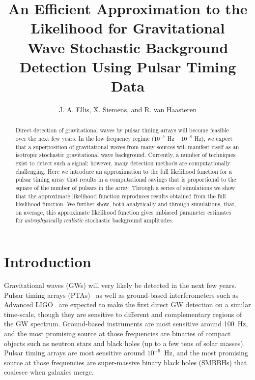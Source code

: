 \documentclass[iop]{emulateapj}
\begin{document}

\title{An Efficient Approximation to the Likelihood for Gravitational\\ Wave Stochastic Background Detection Using Pulsar Timing Data}

\author{J. A. Ellis, X. Siemens, and R. van Haasteren}



\begin{abstract}
Direct detection of gravitational waves by pulsar timing arrays will become feasible over the next few years. In the low frequency regime ($10^{-7}$ Hz -- $10^{-9}$ Hz), we expect that a superposition of gravitational waves from many sources will manifest itself as an isotropic stochastic gravitational wave background. Currently, a number of techniques exist to detect such a signal; however, many detection methods are computationally challenging. Here we introduce an approximation to the full likelihood function for a pulsar timing array that results in a computational savings that is proportional to the square of the number of pulsars in the array. Through a series of simulations we show that the approximate likelihood function reproduces results obtained from the full likelihood function. We further show, both analytically and through simulations, that, on average, this approximate likelihood function gives unbiased parameter estimates for \emph{astrophysically} \emph{realistic} stochastic background amplitudes.
\end{abstract}

\maketitle

\section{Introduction}

Gravitational waves (GWs) will very likely be detected in the next few years. Pulsar timing arrays (PTAs)~\citep{haa+10} as well as ground-based interferometers such as Advanced LIGO~\citep{Waldman:2011vg}  are expected to make the first direct GW detection on a similar time-scale, though they are sensitive to different and complementary regions of the GW spectrum. Ground-based instruments are most sensitive around 100~Hz, and the most promising source at those frequencies are binaries of compact objects such as neutron stars and black holes (up to a few tens of solar masses). Pulsar timing arrays are most sensitive around $10^{-9}$~Hz, and the most promising source at those frequencies are super-massive binary black holes (SMBBHs) that coalesce when galaxies merge.
\end{document}
